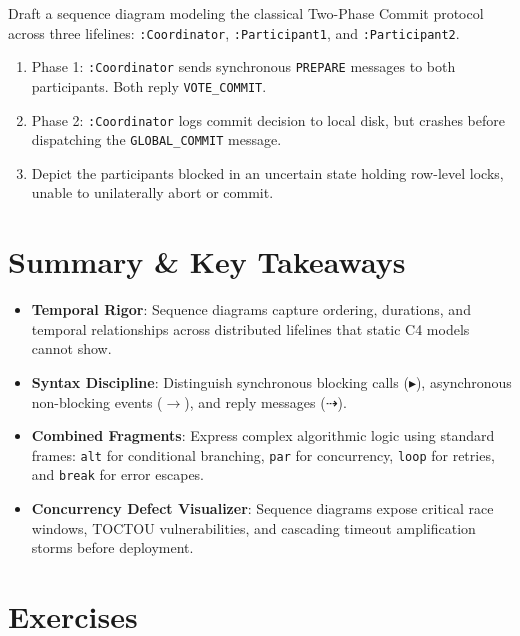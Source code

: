 \begin{tryityourselfbox}
Draft a sequence diagram modeling the classical Two-Phase Commit protocol across three lifelines: \texttt{:Coordinator}, \texttt{:Participant1}, and \texttt{:Participant2}.
\begin{enumerate}
  \item Phase 1: \texttt{:Coordinator} sends synchronous \texttt{PREPARE} messages to both participants. Both reply \texttt{VOTE\_COMMIT}.
  \item Phase 2: \texttt{:Coordinator} logs commit decision to local disk, but crashes before dispatching the \texttt{GLOBAL\_COMMIT} message.
  \item Depict the participants blocked in an uncertain state holding row-level locks, unable to unilaterally abort or commit.
\end{enumerate}
\end{tryityourselfbox}

\section{Summary \protect\& Key Takeaways}

\begin{itemize}[leftmargin=18pt]
  \item \textbf{Temporal Rigor}: Sequence diagrams capture ordering, durations, and temporal relationships across distributed lifelines that static C4 models cannot show.
  \item \textbf{Syntax Discipline}: Distinguish synchronous blocking calls ($\blacktriangleright$), asynchronous non-blocking events ($\rightarrow$), and reply messages ($\dashrightarrow$).
  \item \textbf{Combined Fragments}: Express complex algorithmic logic using standard frames: \texttt{alt} for conditional branching, \texttt{par} for concurrency, \texttt{loop} for retries, and \texttt{break} for error escapes.
  \item \textbf{Concurrency Defect Visualizer}: Sequence diagrams expose critical race windows, TOCTOU vulnerabilities, and cascading timeout amplification storms before deployment.
\end{itemize}

\section{Exercises}


